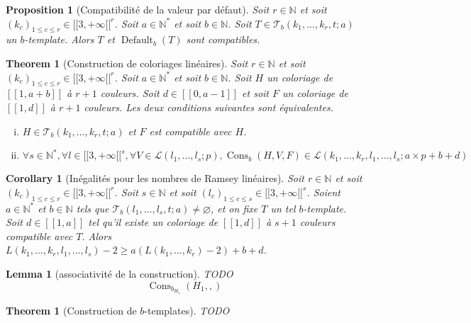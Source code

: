\documentclass{article}
\newtheorem{theorem}[definition]{Theorem}
\newtheorem{corollary}[definition]{Corollary}
\newtheorem{lemma}[definition]{Lemma}
\newtheorem{proposition}[definition]{Proposition}
\DeclareMathOperator{\cons}{Cons}
\DeclareMathOperator{\coldef}{Default}
\begin{document}
\begin{proposition}[Compatibilité de la valeur par défaut]
Soit \(r \in \mathbb{N}\) et soit \((k_c)_{1 \leqslant c \leqslant r}  \in {[\![3, +\infty[\![}^r\). Soit \(a \in \mathbb{N}^*\) et soit \(b \in \mathbb{N}\). Soit \(T \in \mathcal{T}_b(k_1, ..., k_r, t; a)\) un \(b\)-template. Alors \(T\) et \(\coldef_b(T)\) sont compatibles.
\end{proposition}

\begin{theorem}[Construction de coloriages linéaires]
\label{thm:b-temp}
Soit \(r \in \mathbb{N}\) et soit \((k_c)_{1 \leqslant c \leqslant r} \in {[\![3, +\infty[\![}^r\). Soit \(a \in \mathbb{N}^*\) et soit \(b \in \mathbb{N}\). Soit \(H\) un coloriage de \([\![1, a + b]\!]\) à \(r + 1\) couleurs. Soit \(d \in [\![0, a - 1]\!]\) et soit \(F\) un coloriage de \([\![1, d]\!]\) à \(r + 1\) couleurs. Les deux conditions suivantes sont équivalentes.

\begin{enumerate}[(i)]
\item \(H \in \mathcal{T}_b(k_1, ..., k_r, t; a)\) et \(F\) est compatible  avec \(H\).
\item \(\forall s \in \mathbb{N}^*, \forall l \in {[\![3, +\infty[\![}^s, \forall V \in \mathcal{L}(l_1, ..., l_s ; p), \cons_b(H, V, F) \in  \mathcal{L}(k_1, ..., k_r, l_1, ..., l_s ; a \times p + b + d)\)
\end{enumerate}
\end{theorem}

\begin{corollary}[Inégalités pour les nombres de Ramsey linéaires]
Soit \(r \in \mathbb{N}\) et soit \((k_c)_{1 \leqslant c \leqslant r} \in {[\![3, +\infty[\![}^r\). Soit \(s \in \mathbb{N}\) et soit \((l_c)_{1 \leqslant c \leqslant s} \in {[\![3, +\infty[\![}^s\). Soient \(a \in \mathbb{N}^*\) et \(b \in \mathbb{N}\) tels que \(\mathcal{T}_b(l_1, ..., l_s, t; a) \neq \varnothing\), et on fixe \(T\) un tel \(b\)-template. Soit \(d \in [\![1, a]\!]\) tel qu'il existe un coloriage de \([\![1, d]\!]\) à \(s + 1\) couleurs compatible avec \(T\).
Alors \(L(k_1, ..., k_r, l_1, ..., l_s) - 2 \geqslant a (L(k_1, ..., k_r) - 2) + b + d\).
\end{corollary}

\begin{lemma}[associativité de la construction]
TODO
\[
\cons_{b_{H_1}}(H_1, , )
\]
\end{lemma}

\begin{theorem}[Construction de \(b\)-templates]
TODO
\end{theorem}
\end{document}
